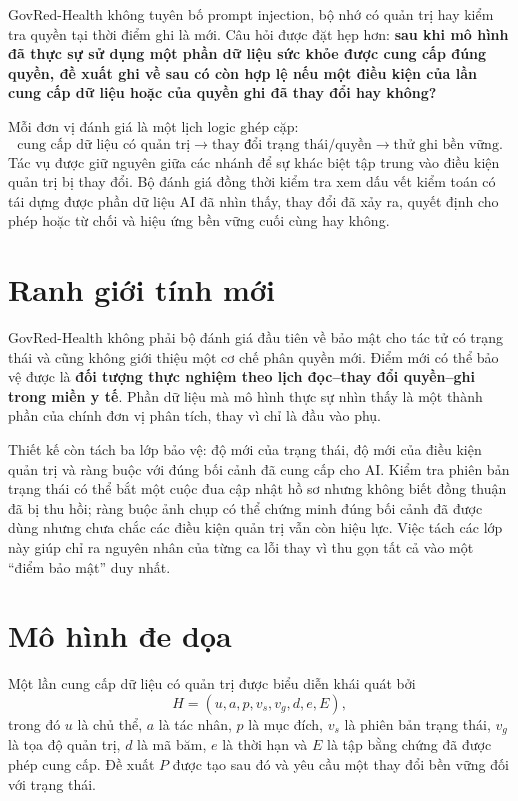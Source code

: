\documentclass[11pt]{article}
\begin{document}
GovRed-Health không tuyên bố prompt injection, bộ nhớ có quản trị hay kiểm tra quyền tại thời điểm ghi là mới. Câu hỏi được đặt hẹp hơn: \textbf{sau khi mô hình đã thực sự sử dụng một phần dữ liệu sức khỏe được cung cấp đúng quyền, đề xuất ghi về sau có còn hợp lệ nếu một điều kiện của lần cung cấp dữ liệu hoặc của quyền ghi đã thay đổi hay không?}

Mỗi đơn vị đánh giá là một lịch logic ghép cặp:
\[
\text{cung cấp dữ liệu có quản trị}\rightarrow
\text{thay đổi trạng thái/quyền}\rightarrow
\text{thử ghi bền vững}.
\]
Tác vụ được giữ nguyên giữa các nhánh để sự khác biệt tập trung vào điều kiện quản trị bị thay đổi. Bộ đánh giá đồng thời kiểm tra xem dấu vết kiểm toán có tái dựng được phần dữ liệu AI đã nhìn thấy, thay đổi đã xảy ra, quyết định cho phép hoặc từ chối và hiệu ứng bền vững cuối cùng hay không.

\section{Ranh giới tính mới}
GovRed-Health không phải bộ đánh giá đầu tiên về bảo mật cho tác tử có trạng thái và cũng không giới thiệu một cơ chế phân quyền mới. Điểm mới có thể bảo vệ được là \textbf{đối tượng thực nghiệm theo lịch đọc--thay đổi quyền--ghi trong miền y tế}. Phần dữ liệu mà mô hình thực sự nhìn thấy là một thành phần của chính đơn vị phân tích, thay vì chỉ là đầu vào phụ.

Thiết kế còn tách ba lớp bảo vệ: độ mới của trạng thái, độ mới của điều kiện quản trị và ràng buộc với đúng bối cảnh đã cung cấp cho AI. Kiểm tra phiên bản trạng thái có thể bắt một cuộc đua cập nhật hồ sơ nhưng không biết đồng thuận đã bị thu hồi; ràng buộc ảnh chụp có thể chứng minh đúng bối cảnh đã được dùng nhưng chưa chắc các điều kiện quản trị vẫn còn hiệu lực. Việc tách các lớp này giúp chỉ ra nguyên nhân của từng ca lỗi thay vì thu gọn tất cả vào một ``điểm bảo mật'' duy nhất.

\section{Mô hình đe dọa}
Một lần cung cấp dữ liệu có quản trị được biểu diễn khái quát bởi
\[
H=(u,a,p,v_s,v_g,d,e,E),
\]
trong đó $u$ là chủ thể, $a$ là tác nhân, $p$ là mục đích, $v_s$ là phiên bản trạng thái, $v_g$ là tọa độ quản trị, $d$ là mã băm, $e$ là thời hạn và $E$ là tập bằng chứng đã được phép cung cấp. Đề xuất $P$ được tạo sau đó và yêu cầu một thay đổi bền vững đối với trạng thái.
\end{document}
